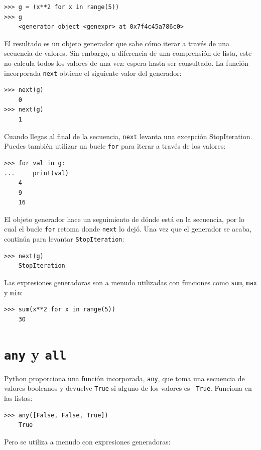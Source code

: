 \documentclass[10pt]{book}
\begin{document}
\begin{verbatim}
>>> g = (x**2 for x in range(5))
>>> g
    <generator object <genexpr> at 0x7f4c45a786c0>
\end{verbatim}
%
El resultado es un objeto generador que sabe cómo iterar a través de
una secuencia de valores.  Sin embargo, a diferencia de una comprensión de lista, este no
calcula todos los valores de una vez: espera hasta ser consultado.  La función
incorporada {\tt next} obtiene el siguiente valor del generador:

\begin{verbatim}
>>> next(g)
    0
>>> next(g)
    1
\end{verbatim}
%
Cuando llegas al final de la secuencia, {\tt next} levanta una
excepción StopIteration.  Puedes también utilizar un bucle {\tt for} para iterar
a través de los valores:

\begin{verbatim}
>>> for val in g:
...     print(val)
    4
    9
    16
\end{verbatim}
%
El objeto generador hace un seguimiento de dónde está en la secuencia,
por lo cual el bucle {\tt for} retoma donde {\tt next} lo dejó.  Una vez que el
generador se acaba, continúa para levantar {\tt StopIteration}:

\begin{verbatim}
>>> next(g)
    StopIteration
\end{verbatim}

Las expresiones generadoras son a menudo utilizadas con funciones como {\tt sum},
{\tt max} y {\tt min}:

\begin{verbatim}
>>> sum(x**2 for x in range(5))
    30
\end{verbatim}


\section{{\tt any} y {\tt all}}

Python proporciona una función incorporada, {\tt any}, que toma una secuencia
de valores booleanos y devuelve {\tt True} si alguno de los valores es {\tt
  True}.  Funciona en las listas:

\begin{verbatim}
>>> any([False, False, True])
    True
\end{verbatim}
%
Pero se utiliza a menudo con expresiones generadoras:
\end{document}
